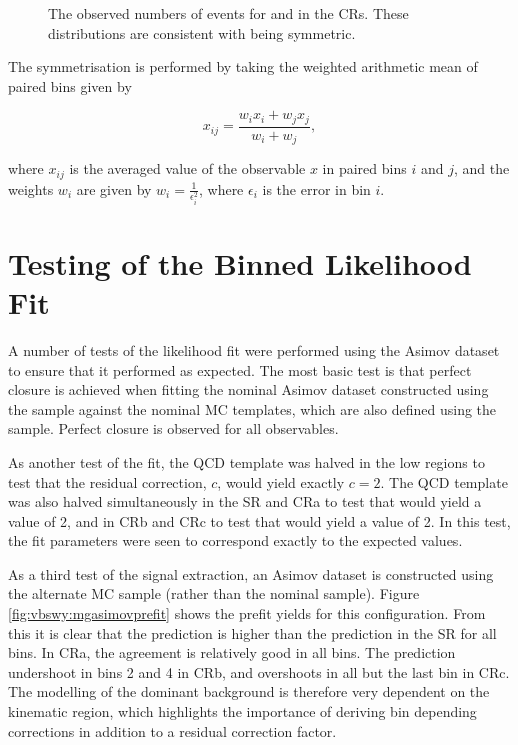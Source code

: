 \begin{figure}[htpb]
{  }
  \caption{The observed numbers of events for \dphisigned and \lepgamdphi in the CRs. These distributions are consistent with being symmetric. \label{fig:data_dphi}}
\end{figure}

The symmetrisation is performed by taking the weighted arithmetic mean of paired bins given by

\begin{equation}
  x_{ij}=\frac{w_ix_i+w_jx_j}{w_i+w_j},
\end{equation}

where $x_{ij}$ is the averaged value of the observable $x$ in paired bins $i$ and $j$, and the weights $w_i$ are given by $w_i=\frac{1}{\epsilon_i^2}$, where $\epsilon_i$ is the error in bin $i$.

\section{Testing of the Binned Likelihood Fit}

A number of tests of the likelihood fit were performed using the Asimov dataset to ensure that it performed as expected. The most basic test is that perfect closure is achieved when fitting the nominal Asimov dataset constructed using the \SHERPA \qcdwy sample against the nominal MC templates, which are also defined using the \SHERPA \qcdwy sample. Perfect closure is observed for all observables. 

As another test of the fit, the QCD template was halved in the low \Ngapjets regions to test that the residual correction, $c$, would yield exactly $c=2$. The QCD template was also halved simultaneously in the SR and CRa to test that \bl would yield a value of 2, and in CRb and CRc to test that \bh would yield a value of 2. In this test, the fit parameters were seen to correspond exactly to the expected values. 

As a third test of the signal extraction, an Asimov dataset is constructed using the alternate \MADGRAPH \qcdwy MC sample (rather than the nominal \SHERPA sample). Figure \ref{fig:vbswy:mgasimovprefit} shows the \mjj prefit yields for this configuration. From this it is clear that the \MADGRAPH \qcdwy prediction is higher than the \SHERPA prediction in the SR for all bins. In CRa, the agreement is relatively good in all bins. The \MADGRAPH prediction undershoot in bins 2 and 4 in CRb, and overshoots in all but the last bin in CRc. The modelling of the dominant background is therefore very dependent on the kinematic region, which highlights the importance of deriving bin depending corrections in addition to a residual correction factor.  


